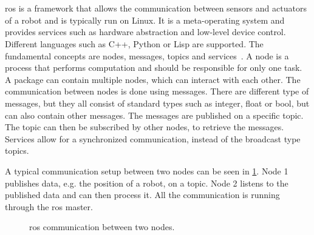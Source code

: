 \section{}
\label{sec:ros}
\acrfull{ros} is a framework that allows the communication between sensors and actuators of a robot and is typically run on Linux.
It is a meta-operating system and provides services such as hardware abstraction and low-level device control.
Different languages such as C++, Python or Lisp are supported.
The fundamental concepts are nodes, messages, topics and services~\cite{Quigley2009}.
A node is a process that performs computation and should be responsible for only one task.
A package can contain multiple nodes, which can interact with each other.
The communication between nodes is done using messages.
There are different type of messages, but they all consist of standard types such as integer, float or bool, but can also contain other messages.
The messages are published on a specific topic.
The topic can then be subscribed by other nodes, to retrieve the messages.
Services allow for a synchronized communication, instead of the broadcast type topics.

A typical communication setup between two nodes can be seen in \cref{fig:ros_framework}.
Node 1 publishes data, e.g. the position of a robot, on a topic.
Node 2 listens to the published data and can then process it.
All the communication is running through the \gls{ros} master.
\begin{figure}[htb]
    \centering
    
    \caption[ communication]{\acrshort{ros} communication between two nodes.}
    \label{fig:ros_framework}
\end{figure}
